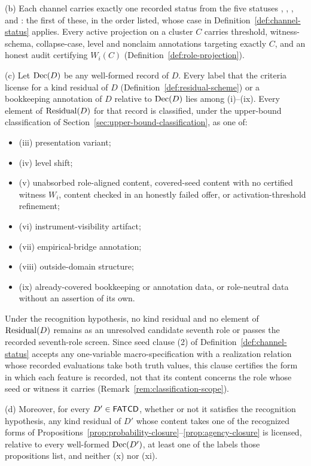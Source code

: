 \begin{theorem}
\par\noindent\textup{(b)} Each channel carries exactly one recorded status from the five statuses \activeproj{}, \collapsedbc{}, \belowthr{},
\outsidescope{} and \absentrec{}: the first of these, in the order listed, whose case in
Definition~\ref{def:channel-status} applies. Every active projection on a cluster \(C\) carries
threshold, witness-schema, collapse-case, level and nonclaim annotations
targeting exactly \(C\), and an honest audit certifying \(W_i(C)\)
(Definition~\ref{def:role-projection}).
\par\noindent\textup{(c)} Let \(\operatorname{Dec}\!\left(D\right)\) be any well-formed record of \(D\). Every label that the criteria license for a kind residual of \(D\)
(Definition~\ref{def:residual-scheme}) or a bookkeeping annotation of \(D\) relative to \(\operatorname{Dec}\!\left(D\right)\) lies among
(i)--(ix). Every element of \(\operatorname{Residual}\!\left(D\right)\) for that record is
classified, under the upper-bound classification of
Section~\ref{sec:upper-bound-classification}, as one of:
\begin{itemize}[topsep=2pt,itemsep=1pt]
  \item (iii) presentation variant;
  \item (iv) level shift;
  \item (v) unabsorbed role-aligned content, covered-seed content with no
    certified witness \(W_i\), content checked in an honestly failed offer, or activation-threshold refinement;
  \item (vi) instrument-visibility artifact;
  \item (vii) empirical-bridge annotation;
  \item (viii) outside-domain structure;
  \item (ix) already-covered bookkeeping or annotation data, or role-neutral data
    without an assertion of its own.
\end{itemize}
Under the recognition hypothesis, no kind residual and no element of \(\operatorname{Residual}\!\left(D\right)\) remains as an unresolved candidate
seventh role or passes the recorded seventh-role screen. Since seed clause (2)
of Definition~\ref{def:channel-status} accepts any one-variable macro-specification with a realization relation
whose recorded evaluations take both truth values, this clause certifies the
form in which each feature is recorded, not that its content concerns the role
whose seed or witness it carries (Remark~\ref{rem:classification-scope}).
\par\noindent\textup{(d)} Moreover, for
every \(D'\in\mathsf{FATCD}{}\), whether or not it satisfies the recognition
hypothesis, any kind residual of \(D'\)
whose content takes one of the recognized forms of
Propositions~\ref{prop:probability-closure}--\ref{prop:agency-closure}
is licensed, relative to every well-formed \(\operatorname{Dec}\!\left(D'\right)\), at least one of the
labels those propositions list, and neither (x) nor (xi).


\end{theorem}
